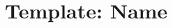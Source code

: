 \documentclass[a4paper, nobind]{templates/ociamthesis}
\begin{document}
\begin{romanpages}

\maketitle




%	

  \dominitoc %

\flushbottom

\tableofcontents



\end{romanpages}

\flushbottom

\minitoc

\newpage

\hypertarget{template-name}{%
\chapter{Template: Name}\label{template-name}}
\end{document}
